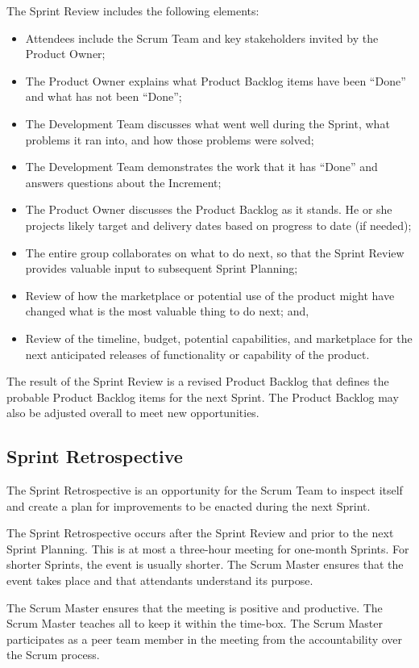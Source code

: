 The Sprint Review includes the following elements:
\begin{itemize}
\item Attendees include the Scrum Team and key stakeholders invited by the Product Owner;
\item The Product Owner explains what Product Backlog items have been ``Done'' and what has
      not been ``Done'';
\item The Development Team discusses what went well during the Sprint, what problems it ran
      into, and how those problems were solved;
\item The Development Team demonstrates the work that it has ``Done'' and answers questions
      about the Increment;
\item The Product Owner discusses the Product Backlog as it stands. He or she projects likely
      target and delivery dates based on progress to date (if needed);
\item The entire group collaborates on what to do next, so that the Sprint Review provides
      valuable input to subsequent Sprint Planning;
\item Review of how the marketplace or potential use of the product might have changed what is
      the most valuable thing to do next; and,
\item Review of the timeline, budget, potential capabilities, and marketplace for the next
      anticipated releases of functionality or capability of the product.
\end{itemize}
The result of the Sprint Review is a revised Product Backlog that defines the probable Product
Backlog items for the next Sprint. The Product Backlog may also be adjusted overall to meet new
opportunities.

\subsection{Sprint Retrospective}
The Sprint Retrospective is an opportunity for the Scrum Team to inspect itself and create a plan
for improvements to be enacted during the next Sprint.

The Sprint Retrospective occurs after the Sprint Review and prior to the next Sprint Planning.
This is at most a three-hour meeting for one-month Sprints. For shorter Sprints, the event is
usually shorter. The Scrum Master ensures that the event takes place and that attendants
understand its purpose.

The Scrum Master ensures that the meeting is positive and productive. The Scrum Master
teaches all to keep it within the time-box. The Scrum Master participates as a peer team
member in the meeting from the accountability over the Scrum process.

